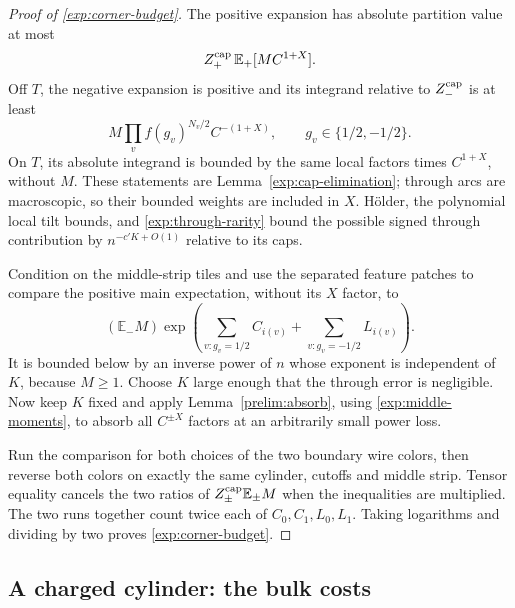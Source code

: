 \begin{proof}[Proof of \eqref{exp:corner-budget}]
The positive expansion has absolute partition value at most
\[
 Z_+^{\rm cap}\,\mathbb E_+[M C^{1+X}].
\]
Off $T$, the negative expansion is positive and its integrand relative
to $Z_-^{\rm cap}$ is at least
\[
 M\prod_v f(g_v)^{N_v/2}C^{-(1+X)},
 \qquad g_v\in\{1/2,-1/2\}.
\]
On $T$, its absolute integrand is bounded by the same local factors
times $C^{1+X}$, without $M$. These statements are
Lemma~\ref{exp:cap-elimination}; through arcs are macroscopic, so their
bounded weights are included in $X$. H\"older, the polynomial local
tilt bounds, and \eqref{exp:through-rarity} bound the possible signed
through contribution by $n^{-c'K+O(1)}$ relative to its caps.

Condition on the middle-strip tiles and use the separated feature
patches to compare the positive main expectation, without its $X$
factor, to
\[
 (\mathbb E_-M)
 \exp\left(\sum_{v:g_v=1/2}C_{i(v)}+
           \sum_{v:g_v=-1/2}L_{i(v)}\right).
\]
It is bounded below by an inverse power of $n$ whose exponent is
independent of $K$, because $M\ge1$. Choose $K$ large enough that the
through error is negligible. Now keep $K$ fixed and apply
Lemma~\ref{prelim:absorb}, using \eqref{exp:middle-moments}, to absorb
all $C^{\pm X}$ factors at an arbitrarily small power loss.

Run the comparison for both choices of the two boundary wire colors,
then reverse both colors on exactly the same cylinder, cutoffs and
middle strip. Tensor equality cancels the two ratios of
$Z_\pm^{\rm cap}\mathbb E_\pm M$ when the inequalities are multiplied.
The two runs together count twice each of $C_0,C_1,L_0,L_1$.
Taking logarithms and dividing by two proves
\eqref{exp:corner-budget}.
\end{proof}

\subsection{A charged cylinder: the bulk costs}

